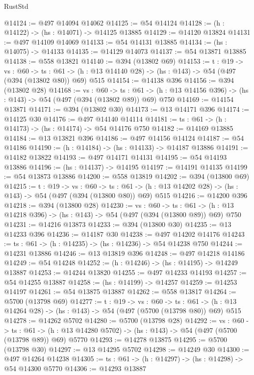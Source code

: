 \begin{lexlean}{RustStd}
\begin{coremodule}
@14124 := @497 @14094 @14062
@14125 := @54 @14124
@14128 := (h : @14122) -> (hs : @14071) -> @14125 @13885
@14129 := @14120 @13824
@14131 := @497 @14109 @14069
@14133 := @54 @14131 @13885
@14134 := (hs : @14075) -> @14133
@14135 := @14129 @14073
@14137 := @54 @13871 @13885
@14138 := @558 @13821
@14140 := @394 (@13802 @69)
@14153 := {t : @19} ->
  {vs : @60} ->
  {ts : @61} -> (h : @13 @14140 @28) -> (hs : @143) -> @54 (@497 (@394 (@13802 @80)) @69) @515
@14154 := @14138 @396
@14156 := @394 (@13802 @28)
@14168 := {vs : @60} ->
  {ts : @61} -> (h : @13 @14156 @396) -> (hs : @143) -> @54 (@497 (@394 (@13802 @89)) @69) @750
@14169 := @14154 @13871
@14171 := @394 (@13802 @30)
@14173 := @13 @14171 @396
@14174 := @14125 @30
@14176 := @497 @14140 @14114
@14181 := {ts : @61} -> (h : @14173) -> (hs : @14174) -> @54 @14176 @750
@14182 := @14169 @13885
@14184 := @13 @13821 @396
@14186 := @497 @14156 @14124
@14187 := @54 @14186
@14190 := (h : @14184) -> (hs : @14133) -> @14187 @13886
@14191 := @14182 @13822
@14193 := @497 @14171 @14131
@14195 := @54 @14193 @13886
@14196 := (hs : @14137) -> @14195
@14197 := @14191 @14135
@14199 := @54 @13873 @13886
@14200 := @558 @13819
@14202 := @394 (@13800 @69)
@14215 := {t : @19} ->
  {vs : @60} ->
  {ts : @61} -> (h : @13 @14202 @28) -> (hs : @143) -> @54 (@497 (@394 (@13800 @80)) @69) @515
@14216 := @14200 @396
@14218 := @394 (@13800 @28)
@14230 := {vs : @60} ->
  {ts : @61} -> (h : @13 @14218 @396) -> (hs : @143) -> @54 (@497 (@394 (@13800 @89)) @69) @750
@14231 := @14216 @13873
@14233 := @394 (@13800 @30)
@14235 := @13 @14233 @396
@14236 := @14187 @30
@14238 := @497 @14202 @14176
@14243 := {ts : @61} -> (h : @14235) -> (hs : @14236) -> @54 @14238 @750
@14244 := @14231 @13886
@14246 := @13 @13819 @396
@14248 := @497 @14218 @14186
@14249 := @54 @14248
@14252 := (h : @14246) -> (hs : @14195) -> @14249 @13887
@14253 := @14244 @13820
@14255 := @497 @14233 @14193
@14257 := @54 @14255 @13887
@14258 := (hs : @14199) -> @14257
@14259 := @14253 @14197
@14261 := @54 @13875 @13887
@14262 := @558 @13817
@14264 := @5700 (@13798 @69)
@14277 := {t : @19} ->
  {vs : @60} ->
  {ts : @61} -> (h : @13 @14264 @28) -> (hs : @143) -> @54 (@497 (@5700 (@13798 @80)) @69) @515
@14278 := @14262 @5702
@14280 := @5700 (@13798 @28)
@14292 := {vs : @60} ->
  {ts : @61} -> (h : @13 @14280 @5702) -> (hs : @143) -> @54 (@497 (@5700 (@13798 @89)) @69) @5770
@14293 := @14278 @13875
@14295 := @5700 (@13798 @30)
@14297 := @13 @14295 @5702
@14298 := @14249 @30
@14300 := @497 @14264 @14238
@14305 := {ts : @61} -> (h : @14297) -> (hs : @14298) -> @54 @14300 @5770
@14306 := @14293 @13887

\end{coremodule}
\end{lexlean}

